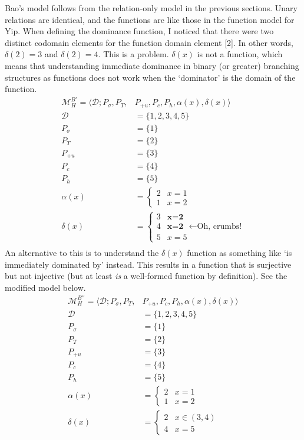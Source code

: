 \documentclass{article}
\begin{document}
Bao's model follows from the relation-only model in the previous sections. Unary relations are identical, and the functions are like those in the function model for Yip. When defining the dominance function, I noticed that there were two distinct codomain elements for the function domain element [2]. In other words, $\delta(2)=3$ and $\delta(2)=4$. This is a problem. $\delta(x)$ is not a function, which means that understanding immediate dominance in binary (or greater) branching structures as functions does not work when the `dominator' is the domain of the function.
 \begin{equation}
\begin{split}
\mathcal{M}^{B'}_{H} = \langle \mathcal{D}; P_{\sigma}, P_{T}, &P_{+u}, P_{c}, P_{h}, \alpha(x), \delta(x) \rangle \\
\mathcal{D} &= \{1, 2, 3, 4, 5\} \\
P_{\sigma} &= \{1\} \\
P_{T} &= \{2\} \\
P_{+u} &= \{3\} \\
P_{c} &= \{4\} \\
P_{h} &= \{5\} \\
\alpha(x) &= \begin{cases} 2 & x=1 \\
				     1 & x=2  \end{cases} \\
\delta(x) &= \begin{cases} 3 & \textbf{x=2}  \\
				     4 & \textbf{x=2} \ \ \ \leftarrow  \text{Oh, crumbs!} \\
				     5 & x=5  \end{cases} \\
\end{split}
\end{equation}
An alternative to this is to understand the $\delta(x)$ function as something like `is immediately dominated by' instead. This results in a function that is surjective but not injective (but at least \emph{is} a well-formed function by definition). See the modified model below.
 \begin{equation}
\begin{split}
\mathcal{M}^{B''}_{H} = \langle \mathcal{D}; P_{\sigma}, P_{T}, &P_{+u}, P_{c}, P_{h}, \alpha(x), \delta(x) \rangle \\
\mathcal{D} &= \{1, 2, 3, 4, 5\} \\
P_{\sigma} &= \{1\} \\
P_{T} &= \{2\} \\
P_{+u} &= \{3\} \\
P_{c} &= \{4\} \\
P_{h} &= \{5\} \\
\alpha(x) &= \begin{cases} 2 & x=1 \\
				     1 & x=2  \end{cases} \\
\delta(x) &= \begin{cases} 2 & x\in(3,4) \\
				     4 & x=5 \end{cases} \\
\end{split}
\end{equation}
\end{document}
